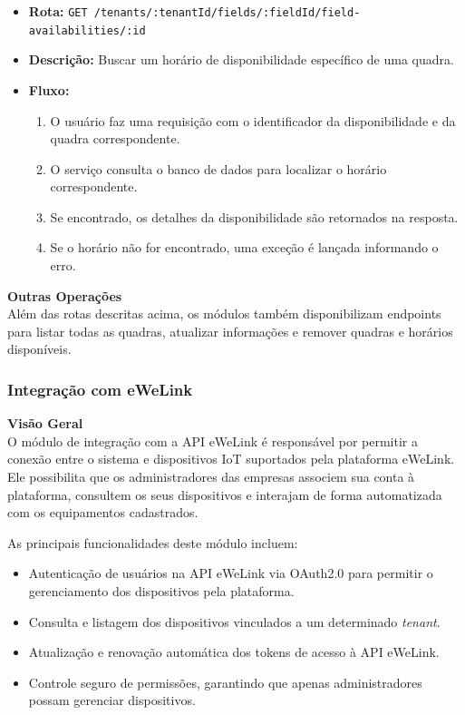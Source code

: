 \begin{itemize}
    \item \textbf{Rota:} \texttt{GET /tenants/:tenantId/fields/:fieldId/field-availabilities/:id}
    \item \textbf{Descrição:} Buscar um horário de disponibilidade específico de uma quadra.
    \item \textbf{Fluxo:}
    \begin{enumerate}
        \item O usuário faz uma requisição com o identificador da disponibilidade e da quadra correspondente.
        \item O serviço consulta o banco de dados para localizar o horário correspondente.
        \item Se encontrado, os detalhes da disponibilidade são retornados na resposta.
        \item Se o horário não for encontrado, uma exceção é lançada informando o erro.
    \end{enumerate}
\end{itemize}

\noindent\textbf{Outras Operações}\\
Além das rotas descritas acima, os módulos também disponibilizam endpoints para listar todas as quadras, atualizar informações e remover quadras e horários disponíveis.

\subsubsection{Integração com eWeLink}\label{subsubsec:integacao_ewelink}

\noindent\textbf{Visão Geral} \\
O módulo de integração com a API eWeLink é responsável por permitir a conexão entre o sistema e dispositivos IoT suportados pela plataforma eWeLink. Ele possibilita que os administradores das empresas associem sua conta à plataforma, consultem os seus dispositivos e interajam de forma automatizada com os equipamentos cadastrados.

As principais funcionalidades deste módulo incluem:

\begin{itemize}
    \item Autenticação de usuários na API eWeLink via OAuth2.0 para permitir o gerenciamento dos dispositivos pela plataforma.
    \item Consulta e listagem dos dispositivos vinculados a um determinado \textit{tenant}.
    \item Atualização e renovação automática dos tokens de acesso à API eWeLink.
    \item Controle seguro de permissões, garantindo que apenas administradores possam gerenciar dispositivos.
\end{itemize}

